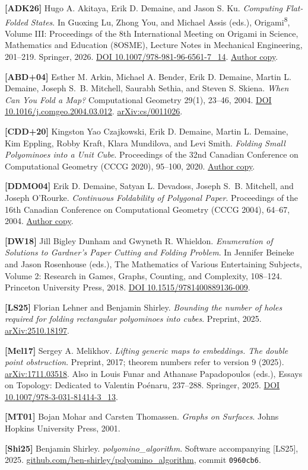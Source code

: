 \documentclass[
  11pt,
]{article}
\begin{document}
\textbf{{[}ADK26{]}} Hugo A. Akitaya, Erik D. Demaine, and Jason S. Ku.
\emph{Computing Flat-Folded States}. In Guoxing Lu, Zhong You, and
Michael Assis (eds.), Origami\textsuperscript{8}, Volume III:
Proceedings of the 8th International Meeting on Origami in Science,
Mathematics and Education (8OSME), Lecture Notes in Mechanical
Engineering, 201--219. Springer, 2026.
\href{https://doi.org/10.1007/978-981-96-6561-7_14}{DOI
10.1007/978-981-96-6561-7\_14}.
\href{https://erikdemaine.org/papers/FlatFolder_OSME2024/}{Author copy}.

\textbf{{[}ABD+04{]}} Esther M. Arkin, Michael A. Bender, Erik D.
Demaine, Martin L. Demaine, Joseph S.~B. Mitchell, Saurabh Sethia, and
Steven S. Skiena. \emph{When Can You Fold a Map?} Computational Geometry
29(1), 23--46, 2004.
\href{https://doi.org/10.1016/j.comgeo.2004.03.012}{DOI
10.1016/j.comgeo.2004.03.012}.
\href{https://arxiv.org/abs/cs/0011026}{arXiv:cs/0011026}.

\textbf{{[}CDD+20{]}} Kingston Yao Czajkowski, Erik D. Demaine, Martin
L. Demaine, Kim Eppling, Robby Kraft, Klara Mundilova, and Levi Smith.
\emph{Folding Small Polyominoes into a Unit Cube}. Proceedings of the
32nd Canadian Conference on Computational Geometry (CCCG 2020), 95--100,
2020. \href{https://erikdemaine.org/papers/CubeFolding_CCCG2020/}{Author
copy}.

\textbf{{[}DDMO04{]}} Erik D. Demaine, Satyan L. Devadoss, Joseph S.~B.
Mitchell, and Joseph O'Rourke. \emph{Continuous Foldability of Polygonal
Paper}. Proceedings of the 16th Canadian Conference on Computational
Geometry (CCCG 2004), 64--67, 2004.
\href{https://erikdemaine.org/papers/PaperReachability_CCCG2004/}{Author
copy}.

\textbf{{[}DW18{]}} Jill Bigley Dunham and Gwyneth R. Whieldon.
\emph{Enumeration of Solutions to Gardner's Paper Cutting and Folding
Problem}. In Jennifer Beineke and Jason Rosenhouse (eds.), The
Mathematics of Various Entertaining Subjects, Volume 2: Research in
Games, Graphs, Counting, and Complexity, 108--124. Princeton University
Press, 2018. \href{https://doi.org/10.1515/9781400889136-009}{DOI
10.1515/9781400889136-009}.

\textbf{{[}LS25{]}} Florian Lehner and Benjamin Shirley. \emph{Bounding
the number of holes required for folding rectangular polyominoes into
cubes}. Preprint, 2025.
\href{https://arxiv.org/abs/2510.18197}{arXiv:2510.18197}.

\textbf{{[}Mel17{]}} Sergey A. Melikhov. \emph{Lifting generic maps to
embeddings. The double point obstruction}. Preprint, 2017; theorem
numbers refer to version 9 (2025).
\href{https://arxiv.org/abs/1711.03518}{arXiv:1711.03518}. Also in Louis
Funar and Athanase Papadopoulos (eds.), Essays on Topology: Dedicated to
Valentin Poénaru, 237--288. Springer, 2025.
\href{https://doi.org/10.1007/978-3-031-81414-3_13}{DOI
10.1007/978-3-031-81414-3\_13}.

\textbf{{[}MT01{]}} Bojan Mohar and Carsten Thomassen. \emph{Graphs on
Surfaces}. Johns Hopkins University Press, 2001.

\textbf{{[}Shi25{]}} Benjamin Shirley. \emph{polyomino\_algorithm}.
Software accompanying {[}LS25{]}, 2025.
\href{https://github.com/ben-shirley/polyomino_algorithm}{github.com/ben-shirley/polyomino\_algorithm},
commit \texttt{0960cb6}.
\end{document}
